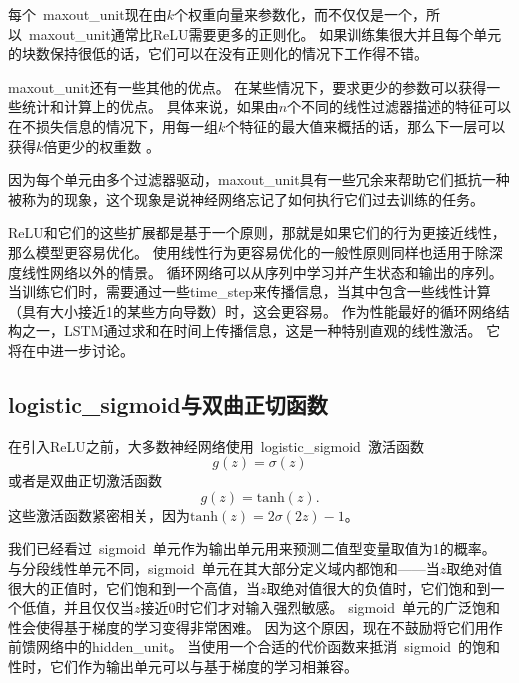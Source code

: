 每个~\gls{maxout_unit}现在由$k$个权重向量来参数化，而不仅仅是一个，所以~\gls{maxout_unit}通常比\gls{ReLU}需要更多的正则化。
如果训练集很大并且每个单元的块数保持很低的话，它们可以在没有正则化的情况下工作得不错\citep{cai2013deep}。

\gls{maxout_unit}还有一些其他的优点。
在某些情况下，要求更少的参数可以获得一些统计和计算上的优点。
具体来说，如果由$n$个不同的线性过滤器描述的特征可以在不损失信息的情况下，用每一组$k$个特征的最大值来概括的话，那么下一层可以获得$k$倍更少的权重数 。

因为每个单元由多个过滤器驱动，\gls{maxout_unit}具有一些冗余来帮助它们抵抗一种被称为的现象，这个现象是说神经网络忘记了如何执行它们过去训练的任务\citep{Goodfellow+al-ICLR2014-small}。

\gls{ReLU}和它们的这些扩展都是基于一个原则，那就是如果它们的行为更接近线性，那么模型更容易优化。
使用线性行为更容易优化的一般性原则同样也适用于除深度线性网络以外的情景。
循环网络可以从序列中学习并产生状态和输出的序列。
当训练它们时，需要通过一些\gls{time_step}来传播信息，当其中包含一些线性计算（具有大小接近1的某些方向导数）时，这会更容易。
作为性能最好的循环网络结构之一，LSTM通过求和在时间上传播信息，这是一种特别直观的线性激活。
它将在中进一步讨论。


\subsection{\gls{logistic_sigmoid}与双曲正切函数}
\label{sec:logistic_sigmoid_and_hyperbolic_tangent}

在引入\gls{ReLU}之前，大多数神经网络使用~\gls{logistic_sigmoid}~激活函数
\begin{equation}
g(z) = \sigma(z)
\end{equation}
或者是双曲正切激活函数
\begin{equation}
g(z) = \text{tanh}(z).
\end{equation}
这些激活函数紧密相关，因为$\text{tanh}(z)=2\sigma(2z)-1$。

我们已经看过~\gls{sigmoid}~单元作为输出单元用来预测二值型变量取值为1的概率。
与分段线性单元不同，\gls{sigmoid}~单元在其大部分定义域内都饱和——当$z$取绝对值很大的正值时，它们饱和到一个高值，当$z$取绝对值很大的负值时，它们饱和到一个低值，并且仅仅当$z$接近0时它们才对输入强烈敏感。
\gls{sigmoid}~单元的广泛饱和性会使得基于梯度的学习变得非常困难。
因为这个原因，现在不鼓励将它们用作前馈网络中的\gls{hidden_unit}。
当使用一个合适的代价函数来抵消~\gls{sigmoid}~的饱和性时，它们作为输出单元可以与基于梯度的学习相兼容。

